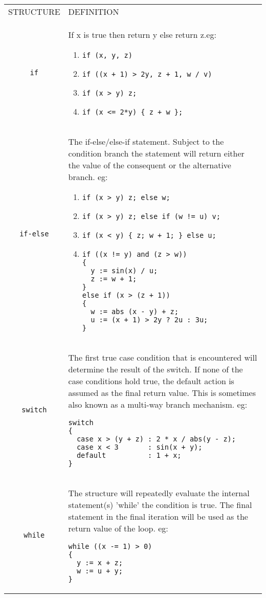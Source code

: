 \begin{tabular}{|c|p{}|}
  \hline
STRUCTURE & DEFINITION\\
\verb'if'& If x is true then return y else return z.eg:
\begin{enumerate}
\item\verb"if (x, y, z)" 
\item\verb"if ((x + 1) > 2y, z + 1, w / v)"
\item\verb"if (x > y) z;"
\item\verb"if (x <= 2*y) { z + w };"
\end{enumerate}\\
\verb'if-else'& The if-else/else-if statement. Subject to the condition 
branch the statement will return either the value of the consequent or
the alternative branch. eg:
\begin{enumerate}
\item\verb"if (x > y) z; else w;"
\item\verb"if (x > y) z; else if (w != u) v;"
\item\verb"if (x < y) { z; w + 1; } else u;"
\item
\begin{verbatim}
if ((x != y) and (z > w))
{   
  y := sin(x) / u;
  z := w + 1;     
}                  
else if (x > (z + 1))
{                    
  w := abs (x - y) + z;
  u := (x + 1) > 2y ? 2u : 3u;
}
\end{verbatim}
\end{enumerate}\\

\verb'switch'& The first true case condition that is encountered will 
determine the result of the switch. If none of the case
conditions hold true, the default action is assumed as 
the final return value. This is sometimes also known as
a multi-way branch mechanism.                          
eg:
\begin{verbatim}
switch                                                 
{                                                      
  case x > (y + z) : 2 * x / abs(y - z);               
  case x < 3       : sin(x + y);                       
  default          : 1 + x;                            
}            
\end{verbatim}
\\
\verb'while'& The structure will repeatedly evaluate the internal     
statement(s) 'while' the condition is true. The final  
statement in the final iteration will be used as the   
return value of the loop.                              
eg:                                                    
\begin{verbatim}
while ((x -= 1) > 0)                                   
{                                                      
  y := x + z;                                          
  w := u + y;                                          
}               
\end{verbatim}
  \\
  \hline
\end{tabular}

